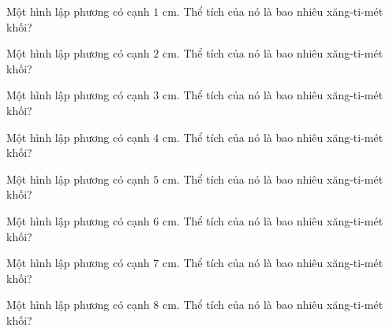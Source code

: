 
\begin{ex}
  Một hình lập phương có cạnh $1\text{ cm}$. Thể tích của nó là bao nhiêu xăng-ti-mét khối?
\end{ex}

\begin{ex}
  Một hình lập phương có cạnh $2\text{ cm}$. Thể tích của nó là bao nhiêu xăng-ti-mét khối?
\end{ex}

\begin{ex}
  Một hình lập phương có cạnh $3\text{ cm}$. Thể tích của nó là bao nhiêu xăng-ti-mét khối?
\end{ex}

\begin{ex}
  Một hình lập phương có cạnh $4\text{ cm}$. Thể tích của nó là bao nhiêu xăng-ti-mét khối?
\end{ex}

\begin{ex}
  Một hình lập phương có cạnh $5\text{ cm}$. Thể tích của nó là bao nhiêu xăng-ti-mét khối?
\end{ex}

\begin{ex}
  Một hình lập phương có cạnh $6\text{ cm}$. Thể tích của nó là bao nhiêu xăng-ti-mét khối?
\end{ex}

\begin{ex}
  Một hình lập phương có cạnh $7\text{ cm}$. Thể tích của nó là bao nhiêu xăng-ti-mét khối?
\end{ex}

\begin{ex}
  Một hình lập phương có cạnh $8\text{ cm}$. Thể tích của nó là bao nhiêu xăng-ti-mét khối?
\end{ex}


